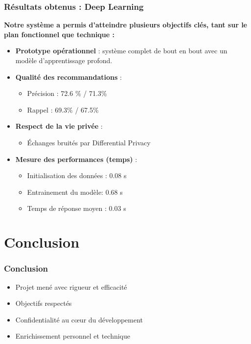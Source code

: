 \documentclass{beamer}
\begin{document}
    \begin{frame}
        \frametitle{Résultats obtenus : Deep Learning}
        \scriptsize
        \textbf{Notre système a permis d’atteindre plusieurs objectifs clés, tant sur le plan fonctionnel que technique :}

        \vspace{0.3cm}
        \begin{itemize}
            \item \textbf{Prototype opérationnel} : système complet de bout en bout avec un modèle d’apprentissage profond.
            \item \textbf{Qualité des recommandations} :
            \begin{itemize}
                \item Précision : 72.6 \% / 71.3\%
                \item Rappel : 69.3\% / 67.5\%
            \end{itemize}
            \item \textbf{Respect de la vie privée} :
            \begin{itemize}
                \item Échanges bruités par Differential Privacy
            \end{itemize}
            \item \textbf{Mesure des performances (temps)} :
            \begin{itemize}
                \item Initialisation des données : 0.08 s
                \item Entrainement du modèle: 0.68 s
                \item Temps de réponse moyen : 0.03 s
            \end{itemize}
        \end{itemize}
    \end{frame}


    \section{Conclusion}
    \begin{frame}
        \frametitle{Conclusion}
        \begin{itemize}
            \item Projet mené avec rigueur et efficacité
            \item Objectifs respectés
            \item Confidentialité au cœur du développement
            \item Enrichissement personnel et technique
        \end{itemize}
    \end{frame}
\end{document}
